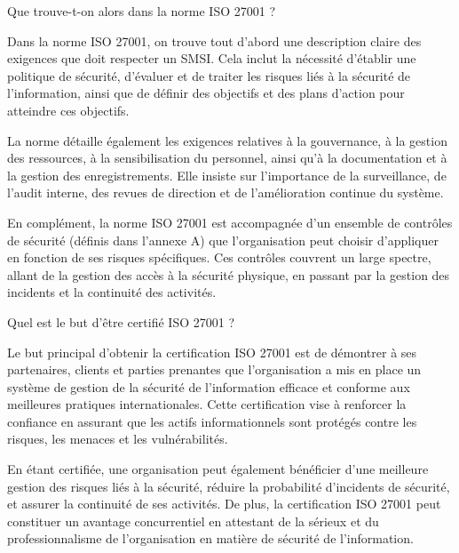 Que trouve-t-on alors dans la norme ISO 27001 ? 

Dans la norme ISO 27001, on trouve tout d’abord une description claire des exigences que doit respecter un SMSI. Cela inclut la nécessité d’établir une politique de sécurité, d’évaluer et de traiter les risques liés à la sécurité de l’information, ainsi que de définir des objectifs et des plans d’action pour atteindre ces objectifs.

La norme détaille également les exigences relatives à la gouvernance, à la gestion des ressources, à la sensibilisation du personnel, ainsi qu’à la documentation et à la gestion des enregistrements. Elle insiste sur l’importance de la surveillance, de l’audit interne, des revues de direction et de l’amélioration continue du système.

En complément, la norme ISO 27001 est accompagnée d’un ensemble de contrôles de sécurité (définis dans l’annexe A) que l’organisation peut choisir d’appliquer en fonction de ses risques spécifiques. Ces contrôles couvrent un large spectre, allant de la gestion des accès à la sécurité physique, en passant par la gestion des incidents et la continuité des activités.

Quel est le but d'être certifié ISO 27001 ? 

Le but principal d'obtenir la certification ISO 27001 est de démontrer à ses partenaires, clients et parties prenantes que l'organisation a mis en place un système de gestion de la sécurité de l'information efficace et conforme aux meilleures pratiques internationales. Cette certification vise à renforcer la confiance en assurant que les actifs informationnels sont protégés contre les risques, les menaces et les vulnérabilités.

En étant certifiée, une organisation peut également bénéficier d'une meilleure gestion des risques liés à la sécurité, réduire la probabilité d'incidents de sécurité, et assurer la continuité de ses activités. De plus, la certification ISO 27001 peut constituer un avantage concurrentiel en attestant de la sérieux et du professionnalisme de l'organisation en matière de sécurité de l'information.




